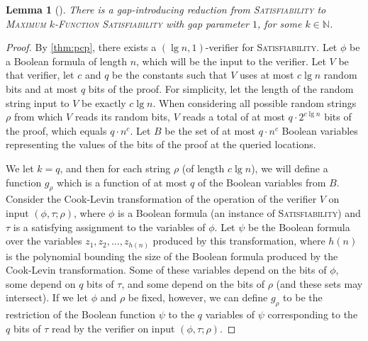 \documentclass[]{article}
\theoremstyle{plain}
\newtheorem{lemma}{Lemma}
\theoremstyle{definition}
\begin{document}
\begin{lemma}[{\cite[Lemma~29.10]{vazirani}}]\label{lem:intro}
  There is a gap-introducing reduction from \textsc{Satisfiability} to \textsc{Maximum $k$-Function Satisfiability} with gap parameter $1$, for some $k \in \mathbb{N}$.
\end{lemma}
\begin{proof}
  By \autoref{thm:pcp}, there exists a $(\lg n, 1)$-verifier for \textsc{Satisfiability}.
  Let $\phi$ be a Boolean formula of length $n$, which will be the input to the verifier.
  Let $V$ be that verifier, let $c$ and $q$ be the constants such that $V$ uses at most $c \lg n$ random bits and at most $q$ bits of the proof.
  For simplicity, let the length of the random string input to $V$ be exactly $c \lg n$.
  When considering all possible random strings $\rho$ from which $V$ reads its random bits, $V$ reads a total of at most $q \cdot 2^{c \lg n}$ bits of the proof, which equals $q \cdot n^c$.
  Let $B$ be the set of at most $q \cdot n^c$ Boolean variables representing the values of the bits of the proof at the queried locations.

  We let $k = q$, and then for each string $\rho$ (of length $c \lg n$), we will define a function $g_\rho$ which is a function of at most $q$ of the Boolean variables from $B$.
  Consider the Cook-Levin transformation of the operation of the verifier $V$ on input $(\phi, \tau; \rho)$, where $\phi$ is a Boolean formula (an instance of \textsc{Satisfiability}) and $\tau$ is a satisfying assignment to the variables of $\phi$.
  Let $\psi$ be the Boolean formula over the variables $z_1, z_2, \ldots, z_{h(n)}$ produced by this transformation, where $h(n)$ is the polynomial bounding the size of the Boolean formula produced by the Cook-Levin transformation.
  Some of these variables depend on the bits of $\phi$, some depend on $q$ bits of $\tau$, and some depend on the bits of $\rho$ (and these sets may intersect).
  If we let $\phi$ and $\rho$ be fixed, however, we can define $g_\rho$ to be the restriction of the Boolean function $\psi$ to the $q$ variables of $\psi$ corresponding to the $q$ bits of $\tau$ read by the verifier on input $(\phi, \tau; \rho)$.


\end{proof}
\end{document}

